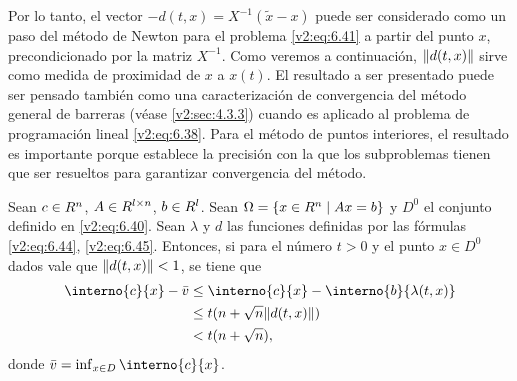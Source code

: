 Por lo tanto, el vector $-d(t, x) = X^{-1}(\tilde{x} - x)$ puede ser considerado como un paso del método de Newton para el problema \eqref{v2:eq:6.41} a partir del punto $x$, precondicionado por la matriz $X^{-1}$. Como veremos a continuación, $\lVert d(t, x)\rVert$ sirve como medida de proximidad de $x$ a $x(t)$. El resultado a ser presentado puede ser pensado también como una caracterización de convergencia del método general de barreras (véase \cref{v2:sec:4.3.3}) cuando es aplicado al problema de programación lineal \eqref{v2:eq:6.38}. Para el método de puntos interiores, el resultado es importante porque establece la precisión con la que los subproblemas tienen que ser resueltos para garantizar convergencia del método.

\begin{proposition}\label{v2:prop:6.1.2}
    Sean $c \in R^n$, $A \in R^{l \times n}$, $b \in R^l$. Sean $\Omega = \{ x \in R^n \mid Ax = b \}$ y $D^0$ el conjunto definido en \eqref{v2:eq:6.40}. Sean $\lambda$ y $d$ las funciones definidas por las fórmulas \eqref{v2:eq:6.44}, \eqref{v2:eq:6.45}.
    Entonces, si para el número $t > 0$ y el punto $x \in D^0$ dados vale que $\lVert d(t, x)\rVert < 1$, se tiene que
    \begin{align}
        \interno{c}{x} - \bar{v} &\le \interno{c}{x} - \interno{b}{\lambda(t, x)} \nonumber \\
        &\le t(n + \sqrt{n}\norm{d(t, x)}) \nonumber \\
        &< t(n + \sqrt{n}), \label{v2:eq:6.46}
    \end{align}
    donde $\bar{v} = \inf_{x \in D} \interno{c}{x}$.
\end{proposition}

